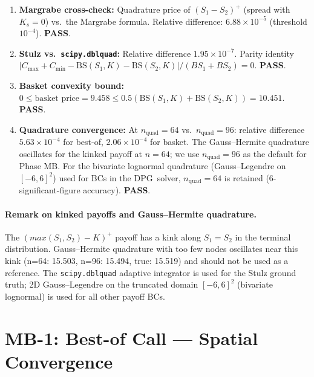 \documentclass[11pt,a4paper]{article}
\newcommand{\dpg}{\textsc{DPG}}
\newcommand{\Ks}{K_s}
\begin{document}
\begin{enumerate}
  \item \textbf{Margrabe cross-check:}
        Quadrature price of $(S_1-S_2)^+$ (spread with $\Ks=0$) vs.\ the
        Margrabe formula.  Relative difference: $6.88\times10^{-5}$ (threshold $10^{-4}$).
        \textbf{PASS}.

  \item \textbf{Stulz vs.\ \texttt{scipy.dblquad}:}
        Relative difference $1.95\times10^{-7}$.  Parity identity
        $|C_{\max}+C_{\min}-\mathrm{BS}(S_1,K)-\mathrm{BS}(S_2,K)|/(BS_1+BS_2) = 0$.
        \textbf{PASS}.

  \item \textbf{Basket convexity bound:}
        $0 \le \text{basket price} = 9.458 \le 0.5(\mathrm{BS}(S_1,K)+\mathrm{BS}(S_2,K))
        = 10.451$.  \textbf{PASS}.

  \item \textbf{Quadrature convergence:}
        At $n_\text{quad}=64$ vs.\ $n_\text{quad}=96$: relative difference
        $5.63\times10^{-4}$ for best-of, $2.06\times10^{-4}$ for basket.
        The Gauss--Hermite quadrature oscillates for the kinked payoff at
        $n=64$; we use $n_\text{quad}=96$ as the default for Phase MB.
        For the bivariate lognormal quadrature (Gauss--Legendre on $[-6,6]^2$)
        used for BCs in the \dpg\ solver, $n_\text{quad}=64$ is retained
        (6-significant-figure accuracy).
        \textbf{PASS}.
\end{enumerate}

\paragraph{Remark on kinked payoffs and Gauss--Hermite quadrature.}
The $(max(S_1,S_2)-K)^+$ payoff has a kink along $S_1=S_2$ in the terminal
distribution.  Gauss--Hermite quadrature with too few nodes oscillates
near this kink (n=64: 15.503, n=96: 15.494, true: 15.519) and should not
be used as a reference.  The \texttt{scipy.dblquad} adaptive integrator is
used for the Stulz ground truth; 2D Gauss--Legendre on the truncated domain
$[-6,6]^2$ (bivariate lognormal) is used for all other payoff BCs.

\section{MB-1: Best-of Call --- Spatial Convergence}
\label{sec:mb1}
\end{document}
